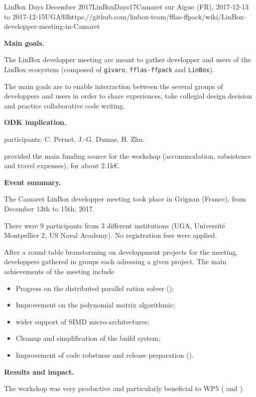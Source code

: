 \begin{event}{LinBox Days December 2017}{LinBoxDays17}{Camaret sur Aigue (FR),
2017-12-13 to 2017-12-15}{UGA}{9}{3}{https://github.com/linbox-team/fflas-ffpack/wiki/LinBox-developper-meeting-in-Camaret}

\textbf{Main goals.}

The LinBox developper meeting are meant to gather developper and users of the
LinBox ecosystem (composed of \texttt{givaro}, \texttt{fflas-ffpack} and
\texttt{LinBox}).

The main goals are to enable interraction between the several groups of
developpers and users in order to share experiences, take collegial design
decision and practice collaborative code writing.

\textbf{ODK implication.} 

\ODK participants: C. Pernet, J.-G. Dumas, H. Zhu.

\ODK provided the main funding source for the workshop (accommodation,
subsistence and travel expenses), for about 2.1k\euro.

\textbf{Event summary.} 

The Camaret LinBox developper meeting took place in Grignan (France), from December
13th to 15th, 2017.

There were 9 participants from 3 different institutions (UGA, Université
Montpellier 2, US Naval Academy).
No registration fees were applied.

After a round table branstorming on developpment projects for the meeting,
developpers gathered in groups each adressing a given project.
The main achievements of the meeting include
\begin{itemize}
\item Progress on the distributed parallel ration solver ();
\item Improvement on the polynomial matrix algorithmic;
\item wider support of SIMD micro-architectures;
\item Cleanup and simplification of the build system;
\item Improvement of code robstness and release preparation ().
\end{itemize}


\textbf{Results and impact.} 

The workshop was very productive and particularly beneficial to WP5
( and ).
\end{event}
